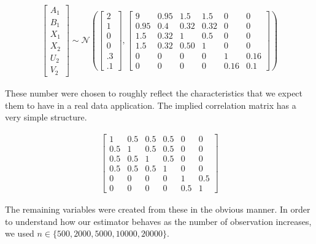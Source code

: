 \begin{align} \label{eq:simulation_model}
\begin{bmatrix}
  A_1\\
  B_1\\
  X_1\\
  X_2\\
  U_2\\
  V_2 
\end{bmatrix}
\sim
\mathcal{N}\left(
\begin{bmatrix}
2 \\ 
1 \\ 
0 \\ 
0 \\ 
.3 \\
.1 
\end{bmatrix}
,
\begin{bmatrix}
  9 & 0.95 & 1.5 & 1.5 & 0 & 0 \\
  0.95 & 0.4 & 0.32 & 0.32 & 0 & 0 \\
  1.5 & 0.32 & 1 & 0.5 & 0 & 0 \\
  1.5 & 0.32 & 0.50 & 1 & 0 & 0 \\ 
  0 & 0 & 0 & 0 & 1 & 0.16 \\
  0 & 0 & 0 & 0 & 0.16 & 0.1 
\end{bmatrix}
\right)
\end{align}

These number were chosen to roughly reflect the characteristics that we expect them to have in a real data
application. The implied correlation matrix has a very simple structure.

\begin{align}  \label{eq:simulation_correlation}
  \begin{bmatrix}
      1&  0.5& 0.5&  0.5&  0&  0 \\
      0.5&  1& 0.5&  0.5&  0&  0 \\
      0.5& 0.5&  1&  0.5&  0&  0 \\
      0.5& 0.5& 0.5&   1&  0&  0 \\
      0&   0&  0&   0&  1& 0.5 \\
      0&   0&  0&   0& 0.5&  1
  \end{bmatrix}  
\end{align}

The remaining variables were created from these in the obvious manner. In order to understand how our estimator behaves as the number of observation increases, we used $n \in \{500, 2000, 5000, 10000, 20000 \}$.

